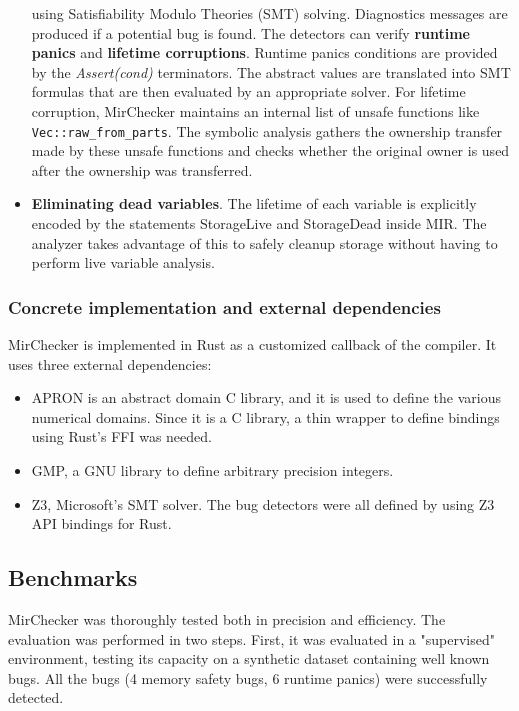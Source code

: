 \documentclass{article}
\begin{document}
\begin{itemize}
    using Satisfiability Modulo Theories (SMT) solving. Diagnostics messages are produced if a potential bug is found. The detectors 
    can verify \textbf{runtime panics} and \textbf{lifetime corruptions}. Runtime panics conditions 
    are provided by the \textit{Assert(cond)} terminators. The abstract values are translated into SMT formulas 
    that are then evaluated by an appropriate solver. For lifetime corruption, MirChecker maintains an internal 
    list of unsafe functions like \texttt{Vec::raw_from_parts}. The symbolic analysis gathers the ownership transfer made by these unsafe functions and checks whether the original owner is used 
    after the ownership was transferred.
    \item \textbf{Eliminating dead variables}. The lifetime of each variable is explicitly encoded by the statements 
    StorageLive and StorageDead inside MIR. The analyzer takes advantage of this to safely cleanup storage without having to perform 
    live variable analysis.
\end{itemize}
\subsubsection{Concrete implementation and external dependencies}

MirChecker is implemented in Rust as a customized callback of the compiler.  It uses three external dependencies: \begin{itemize}
    \item APRON is an abstract domain C library, and it is used to define  the various numerical domains. Since it is a C library, 
    a thin wrapper to define  bindings using  Rust's FFI was needed.
    \item GMP, a GNU library to define arbitrary precision integers. 
    \item Z3, Microsoft's SMT solver. The bug detectors were all defined by using Z3 API bindings for Rust.
\end{itemize}
\subsection{Benchmarks}
MirChecker  was thoroughly tested both in precision and efficiency. The evaluation was performed
in two steps. First, it was evaluated in a "supervised" environment, testing its capacity on a synthetic dataset 
containing well known bugs. All the bugs (4 memory safety bugs, 6 runtime panics) were successfully detected. 
\end{document}
